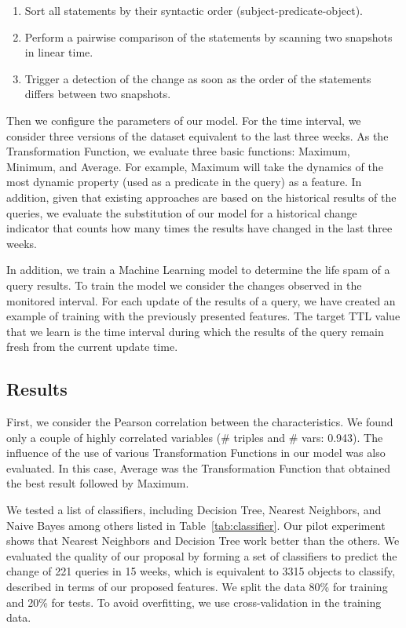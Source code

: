 \documentclass[runningheads]{llncs}
\begin{document}
\begin{enumerate}
	\item Sort all statements by their syntactic order (subject-predicate-object).
	\item Perform a pairwise comparison of the statements by scanning two snapshots in linear time.
	\item Trigger a detection of the change as soon as the order of the statements differs between two snapshots.
\end{enumerate}

Then we configure the parameters of our model. For the time interval, we consider three versions of the dataset equivalent to the last three weeks. As the Transformation Function, we evaluate three basic functions: Maximum, Minimum, and Average. For example, Maximum will take the dynamics of the most dynamic property (used as a predicate in the query) as a feature.
In addition, given that existing approaches are based on the historical results of the queries, we evaluate the substitution of our model for a historical change indicator that counts how many times the results have changed in the last three weeks.

In addition, we train a Machine Learning model to determine the life spam of a query results. To train the model we consider the changes observed in the monitored interval. For each update of the results of a query, we have created an example of training with the previously presented features. The target TTL value that we learn is the time interval during which the results of the query remain fresh from the current update time.

\subsection{Results}

First, we consider the Pearson correlation between the characteristics. We found only a couple of highly correlated variables (\# triples and \# vars: 0.943). The influence of the use of various Transformation Functions in our model was also evaluated. In this case, Average was the Transformation Function that obtained the best result followed by Maximum.

We tested a list of classifiers, including Decision Tree, Nearest Neighbors, and Naive Bayes among others listed in Table~\ref{tab:classifier}. Our pilot experiment shows that Nearest Neighbors and Decision Tree work better than the others. We evaluated the quality of our proposal by forming a set of classifiers to predict the change of 221 queries in 15 weeks, which is equivalent to 3315 objects to classify, described in terms of our proposed features. We split the data 80\% for training and 20\% for tests. To avoid overfitting, we use cross-validation in the training data.
\end{document}
